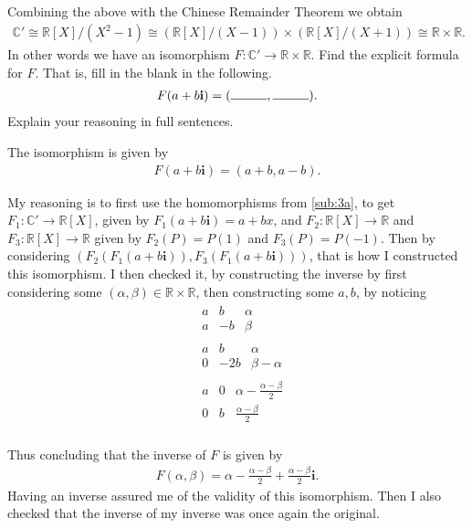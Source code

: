 \documentclass[10pt]{armath}
\newcommand{\R}{\mathbb{R}}
\newcommand{\C}{\mathbb{C}}
\newcommand{\ra}{\rightarrow}
\begin{document}
\subsection{}%
\label{sub:3c}

Combining the above with the Chinese Remainder Theorem we obtain
\begin{align*}
  \C'\cong\R[X]/(X^2-1)\cong(\R[X]/(X-1))\times(\R[X]/(X+1))\cong\R\times\R.
\end{align*}
In other words we have an isomorphism $F:\C'\ra\R\times\R$. Find the explicit
formula for $F$. That is, fill in the blank in the following.
\begin{align*}
  F(a+b\mathbf{i})=(\rule{1cm}{0.15mm},\rule{1cm}{0.15mm}).
\end{align*}
Explain your reasoning in full sentences.

The isomorphism is given by
\begin{align*}
   F(a+b\mathbf{i})=(a+b,a-b).
\end{align*}

My reasoning is to first use the homomorphisms from \ref{sub:3a}, to get
$F_1:\C'\ra\R[X]$, given by $F_1(a+b\mathbf{i})=a+bx$, and $F_2:\R[X]\ra\R$ and
$F_3:\R[X]\ra\R$ given by $F_2(P)=P(1)$ and $F_3(P)=P(-1)$. Then by considering
$(F_2(F_1(a+b\mathbf{i})), F_3(F_1(a+b\mathbf{i})))$, that is how I constructed
this isomorphism. I then checked it, by constructing the inverse by first
considering some $(\alpha,\beta)\in\R\times\R$, then constructing some $a,b$,
by noticing
\begin{align*}
  &\begin{array}{cc|c}
    a & b & \alpha\\
    a & -b & \beta
  \end{array}\\
  &\begin{array}{cc|c}
    a & b & \alpha\\
    0 & -2b & \beta-\alpha
  \end{array}\\
  &\begin{array}{cc|c}
    a & 0 & \alpha-\frac{\alpha-\beta}{2}\\
    0 & b & \frac{\alpha-\beta}{2}
  \end{array}\\
\end{align*}

Thus concluding that the inverse of $F$ is given by
\begin{align*}
   F(\alpha,\beta)=\alpha-\frac{\alpha-\beta}{2}+\frac{\alpha-\beta}{2}\mathbf{i}.
\end{align*}
Having an inverse assured me of the validity of this isomorphism. Then I also
checked that the inverse of my inverse was once again the original.
\end{document}
